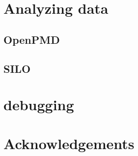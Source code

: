 \section{Analyzing data}
\label{sec:data}

\subsection{OpenPMD}
\label{sec:openpmd}

\subsection{SILO}
\label{sec:silo}

\section{\CarpetX\space debugging}
\label{sec:debugging}


\section{Acknowledgements}

\begin{thebibliography}{9}
\end{thebibliography}


